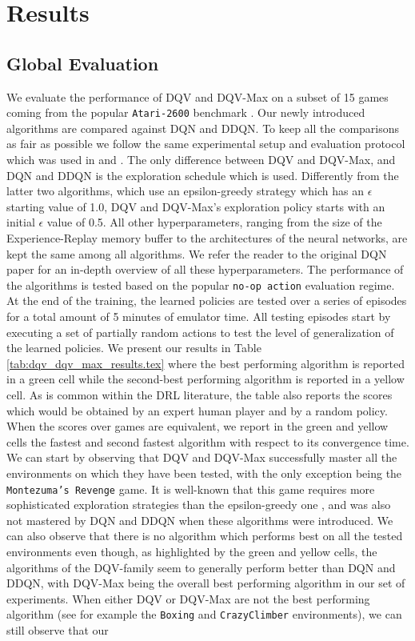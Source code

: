 \section{Results}
\label{sec:results}

\subsection{Global Evaluation}
\label{sec:global_evaluation}

We evaluate the performance of DQV and DQV-Max on a subset of 15 games coming from the popular \texttt{Atari-2600} benchmark \cite{bellemare2013arcade}. Our newly introduced algorithms are compared against DQN and DDQN. To keep all the comparisons as fair as possible we follow the same experimental setup and evaluation protocol which was used in \cite{mnih2015human} and \cite{van2016deep}. The only difference between DQV and DQV-Max, and DQN and DDQN is the exploration schedule which is used. Differently from the latter two algorithms, which use an epsilon-greedy strategy which has an $\epsilon$ starting value of 1.0, DQV and DQV-Max's exploration policy starts with an initial $\epsilon$ value of 0.5. All other hyperparameters, ranging from the size of the Experience-Replay memory buffer to the architectures of the neural networks, are kept the same among all algorithms. We refer the reader to the original DQN paper \cite{mnih2015human} for an in-depth overview of all these hyperparameters. The performance of the algorithms is tested based on the popular \texttt{no-op action} evaluation regime. At the end of the training, the learned policies are tested over a series of episodes for a total amount of 5 minutes of emulator time. All testing episodes start by executing a set of partially random actions to test the level of generalization of the learned policies. We present our results in Table \ref{tab:dqv_dqv_max_results.tex} where the best performing algorithm is reported in a green cell while the second-best performing algorithm is reported in a yellow cell. As is common within the DRL literature, the table also reports the scores which would be obtained by an expert human player and by a random policy. When the scores over games are equivalent, we report in the green and yellow cells the fastest and second fastest algorithm with respect to its convergence time. We can start by observing that DQV and DQV-Max successfully master all the environments on which they have been tested, with the only exception being the \texttt{Montezuma's Revenge} game. It is well-known that this game requires more sophisticated exploration strategies than the epsilon-greedy one \cite{fortunato2017noisy}, and was also not mastered by DQN and DDQN when these algorithms were introduced. We can also observe that there is no algorithm which performs best on all the tested environments even though, as highlighted by the green and yellow cells, the algorithms of the DQV-family seem to generally perform better than DQN and DDQN, with DQV-Max being the overall best performing algorithm in our set of experiments. When either DQV or DQV-Max are not the best performing algorithm (see for example the \texttt{Boxing} and \texttt{CrazyClimber} environments), we can still observe that our 